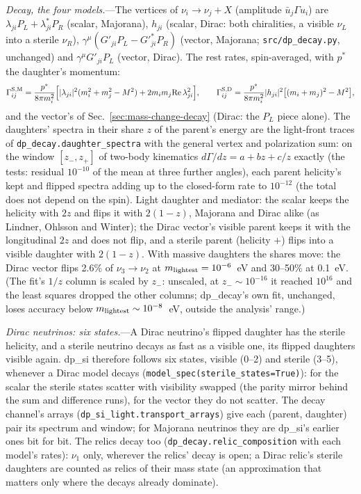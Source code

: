\documentclass[11pt,a4paper]{article}
\newcommand{\file}[1]{\nolinkurl{#1}}
\begin{document}
\textit{Decay, the four models.}---The vertices of $\nu_i \to \nu_j + X$ (amplitude $\bar u_j\Gamma u_i$) are
$\lambda_{ji}P_L + \lambda^*_{ji}P_R$ (scalar, Majorana), $h_{ji}$ (scalar, Dirac: both chiralities, a visible $\nu_L$ into
a sterile $\nu_R$), $\gamma^\mu(G'_{ji}P_L - G'^*_{ji}P_R)$ (vector, Majorana; \file{src/dp\_decay.py}, unchanged) and
$\gamma^\mu G'_{ji}P_L$ (vector, Dirac). The rest rates, spin-averaged, with $p^*$ the daughter's momentum:
\begin{equation}
\Gamma^{\rm S,M}_{ij} = \frac{p^*}{8\pi m_i^2}\Big[|\lambda_{ji}|^2(m_i^2 + m_j^2 - M^2) + 2m_im_j{\rm Re}\,\lambda_{ji}^2\Big],
\qquad
\Gamma^{\rm S,D}_{ij} = \frac{p^*}{8\pi m_i^2}|h_{ji}|^2\big[(m_i + m_j)^2 - M^2\big],
\end{equation}
and the vector's of Sec.~\ref{sec:mass-change-decay} (Dirac: the $P_L$ piece alone). The daughters' spectra in their share
$z$ of the parent's energy are the light-front traces of \texttt{dp\_decay.daughter\_spectra} with the general vertex
and polarization sum: on the window $[z_-, z_+]$ of two-body kinematics $d\Gamma/dz = a + bz + c/z$ exactly (the tests:
residual $10^{-10}$ of the mean at three further angles), each parent helicity's kept and flipped spectra adding up to the
closed-form rate to $10^{-12}$ (the total does not depend on the spin). Light daughter and mediator: the scalar keeps
the helicity with $2z$ and flips it with $2(1-z)$, Majorana and Dirac alike (as Lindner, Ohlsson and Winter); the Dirac
vector's visible parent keeps it with the longitudinal $2z$ and does not flip, and a sterile parent (helicity $+$) flips
into a visible daughter with $2(1-z)$. With massive daughters the shares move: the Dirac vector flips 2.6\% of
$\nu_3\to\nu_2$ at $m_{\rm lightest} = 10^{-6}$~eV and 30--50\% at 0.1~eV. (The fit's $1/z$ column is scaled by $z_-$:
unscaled, at $z_- \sim 10^{-16}$ it reached $10^{16}$ and the least squares dropped the other columns; dp\_decay's own
fit, unchanged, loses accuracy below $m_{\rm lightest} \sim 10^{-8}$~eV, outside the analysis' range.)

\textit{Dirac neutrinos: six states.}---A Dirac neutrino's flipped daughter has the sterile helicity, and a sterile
neutrino decays as fast as a visible one, its flipped daughters visible again. dp\_si therefore follows six states,
visible (0--2) and sterile (3--5), whenever a Dirac model decays (\texttt{model\_spec(sterile\_states=True)}): for the
scalar the sterile states scatter with visibility swapped (the parity mirror behind the sum and difference runs), for the
vector they do not scatter. The decay channel's arrays (\texttt{dp\_si\_light.transport\_arrays}) give each (parent,
daughter) pair its spectrum and window; for Majorana neutrinos they are dp\_si's earlier ones bit for bit. The relics
decay too (\texttt{dp\_decay.relic\_composition} with each model's rates): $\nu_1$ only, wherever the relics' decay is
open; a Dirac relic's sterile daughters are counted as relics of their mass state (an approximation that matters only
where the decays already dominate).
\end{document}
